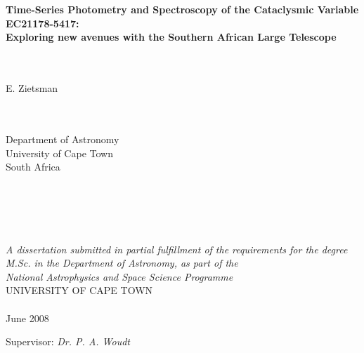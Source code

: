 \documentclass[a4paper,12pt]{report}
\begin{document}
\begin{titlepage}
\begin{center}
{
\LARGE
\vskip 0.5cm

\vskip 0.5cm
\ \ \\
\ \ \\
{\bf Time-Series Photometry and Spectroscopy of the Cataclysmic Variable EC21178-5417:\\Exploring new avenues with the Southern African Large Telescope}
\ \  \\
\ \  \\
\ \  \\
\large

E. Zietsman\\

\ \  \\
\ \  \\

\rm 
\normalsize

Department of Astronomy\\
University of Cape Town\\
South Africa
\ \  \\
\ \  \\
\ \  \\
\ \  \\
\ \  \\
\ \  \\


{\it A dissertation submitted in partial fulfillment of the requirements for the degree M.Sc. in the Department of Astronomy, as part of the\\ 
National Astrophysics and Space Science Programme}\\

\rm
 UNIVERSITY OF CAPE TOWN \\

\ \  \\


\medskip
June 2008}

\vspace*{3cm}
Supervisor: {\it Dr. P. A. Woudt}
\end{center}


\end{titlepage}




\newenvironment{narrow}[2]{%
\begin{list}{}{%
\setlength{\topsep}{0pt}%
\setlength{\leftmargin}{#1}%
\setlength{\rightmargin}{#2}%
\setlength{\listparindent}{\parindent}%
\setlength{\itemindent}{\parindent}%
\setlength{\parsep}{\parskip}}%
\item[]}{\end{list}}
\end{document}
